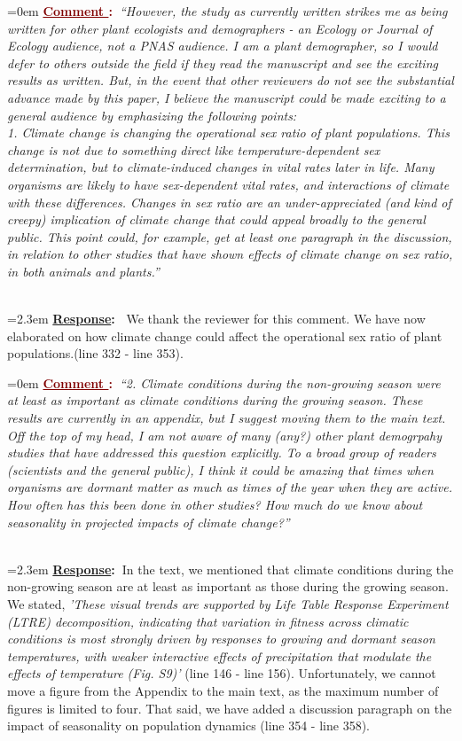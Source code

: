 \documentclass[12pt]{article}
\newcounter{cN}
\newcommand{\comment}[1]{
	\vspace{2em}
	\refstepcounter{cN} %
	\noindent \hangindent=0em \textbf{\textcolor{Maroon}{\uline{Comment \thecN}:~}}\emph{``#1''}
	}
\newcommand{\response}[1]{
	\\[0.25em]
	\hangindent=2.3em \textbf{\textcolor{NavyBlue}{\uline{Response}:~}}#1
	}
\begin{document}
\comment{However, the study as currently written strikes me as being written for other plant ecologists and demographers - an Ecology or Journal of Ecology audience, not a PNAS audience. I am a plant demographer, so I would defer to others outside the field if they read the manuscript and see the exciting results as written. But, in the event that other reviewers do not see the substantial advance made by this paper, I believe the manuscript could be made exciting to a general audience by emphasizing the following points:
\\
1. Climate change is changing the operational sex ratio of plant populations. This change is not due to something direct like temperature-dependent sex determination, but to climate-induced changes in vital rates later in life. Many organisms are likely to have sex-dependent vital rates, and interactions of climate with these differences. Changes in sex ratio are an under-appreciated (and kind of creepy) implication of climate change that could appeal broadly to the general public. This point could, for example, get at least one paragraph in the discussion, in relation to other studies that have shown effects of climate change on sex ratio, in both animals and plants.}
\response{ We thank the reviewer for this comment. We have now elaborated on how climate change could affect the operational sex ratio of plant populations.(line 332 - line 353).}

\comment{2. Climate conditions during the non-growing season were at least as important as climate conditions during the growing season. These results are currently in an appendix, but I suggest moving them to the main text. Off the top of my head, I am not aware of many (any?) other plant demogrpahy studies that have addressed this question explicitly. To a broad group of readers (scientists and the general public), I think it could be amazing that times when organisms are dormant matter as much as times of the year when they are active. How often has this been done in other studies? How much do we know about seasonality in projected impacts of climate change?}
\response{In the text, we mentioned that climate conditions during the non-growing season are at least as important as those during the growing season. We stated, \emph{'These visual trends are supported by Life Table Response Experiment (LTRE) decomposition, indicating that variation in fitness across climatic conditions is most strongly driven by responses to growing and dormant season temperatures, with weaker interactive effects of precipitation that modulate the effects of temperature (Fig. S9)'} (line 146 - line 156). Unfortunately, we cannot move a figure from the Appendix to the main text, as the maximum number of figures is limited to four. That said, we have added a discussion paragraph on the impact of seasonality on population dynamics (line 354 - line 358).}
\end{document}
